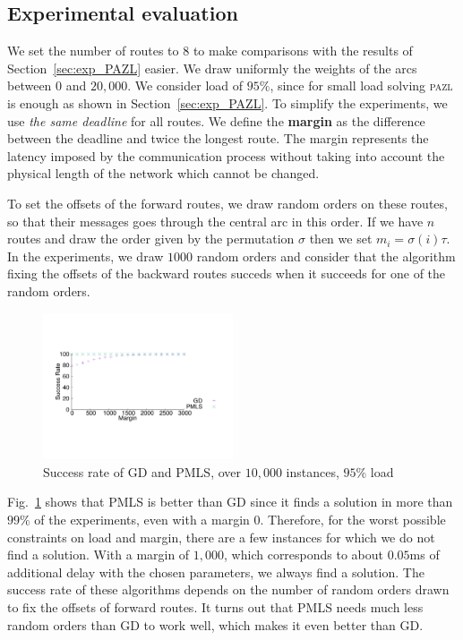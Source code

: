 \documentclass[a4paper,10pt]{IEEEtran}
\newcommand\pazl{\textsc{pazl}\xspace}
\begin{document}
     
    \subsection{Experimental evaluation}
    \label{sec:resultsPALL}
    
    We set the number of routes to $8$ to make comparisons with the results of Section~\ref{sec:exp_PAZL} easier. 
    We draw uniformly the weights of the arcs between $0$ and $20,000$. We consider load of $95\%$, since for small load solving \pazl is enough as shown in Section~\ref{sec:exp_PAZL}. To simplify the experiments, 
    we use \emph{the same deadline} for all routes. We define the {\bf margin} as the difference between the deadline and twice the longest route. The margin represents the latency imposed by the communication process without taking into account the physical length of the network which cannot be changed.
  
   
   To set the offsets of the forward routes, we draw random orders on these routes, so that their messages goes through 
   the central arc in this order. If we have $n$ routes and draw the order given by the permutation $\sigma$ then we set $m_{i} = \sigma(i)\tau$. In the experiments, we draw $1000$ random orders and consider that the algorithm fixing the offsets of the backward routes succeds when it succeeds for one of the random orders.
      
     
    \begin{figure} 
       \begin{center}
      \includegraphics[width=0.5\textwidth]{retour_21000.pdf}
      \end{center}
      \caption{Success rate of GD and PMLS, over $10,000$ instances, $95\%$ load}
     \label{fig:success21000}
    
     \end{figure}
        
     
Fig.~\ref{fig:success21000} shows that PMLS is better than GD since it finds a solution in more than $99\%$ of the experiments, even with a margin $0$. Therefore, for the worst possible constraints on load and margin, there are a few instances for which we do not find a solution. With a margin of $1,000$, which corresponds to about $0.05$ms of additional delay with the chosen parameters, we always find a solution. The success rate of these algorithms depends on the number of random orders drawn to fix the offsets of forward routes. It turns out that PMLS needs much less random orders than GD to work well, which makes it even better than GD.   
\end{document}
